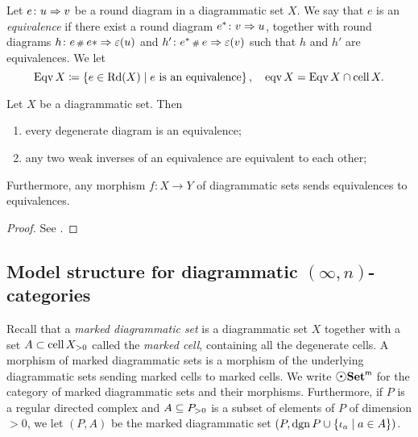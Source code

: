 \begin{dfn} [Equivalence] 
    Let \( e \colon u \celto v \) be a round diagram in a diagrammatic set \( X \).
    We say that \( e \) is an \emph{equivalence} if there exist a round diagram \( e^* \colon v \celto u \), together with round diagrams \( h \colon e \cp{} e* \celto \un(u) \) and \( h' \colon e^* \cp{} e \celto \un(v) \) such that \( h \) and \( h' \) are equivalences.
    We let
    \begin{equation*}
        \Eqv X \eqdef \set{e \in \Rd(X) \mid e \text{ is an equivalence}},\quad \eqv X = \Eqv X \cap \cell X.
    \end{equation*}
\end{dfn}

\begin{prop} \label{prop:main_equivalence}
    Let \( X \) be a diagrammatic set.
    Then
    \begin{enumerate}
        \item every degenerate diagram is an equivalence;
        \item any two weak inverses of an equivalence are equivalent to each other;
    \end{enumerate}
    Furthermore, any morphism \( f \colon X \to Y \) of diagrammatic sets sends equivalences to equivalences.
\end{prop}
\begin{proof}
    See \cite[Theorem 2.13, Corollary 2.29, Proposition 2.31]{chanavat2024equivalences}.
\end{proof}

\subsection{Model structure for diagrammatic \texorpdfstring{$(\infty, n)$}{(∞, n)}-categories}


Recall that a \emph{marked diagrammatic set} is a diagrammatic set \( X \) together with a set \( A \subset \gr{> 0}{\cell X} \) called the \emph{marked cell}, containing all the degenerate cells. 
A morphism of marked diagrammatic sets is a morphism of the underlying diagrammatic sets sending marked cells to marked cells.
We write \( \mdgmSet \) for the category of marked diagrammatic sets and their morphisms. 
Furthermore, if \( P \) is a regular directed complex and \( A \subseteq \gr{> 0}{P} \) is a subset of elements of \( P \) of dimension \( > 0 \), we let \( (P, A) \) be the marked diagrammatic set \( (P, \dgn P \cup \set{\mapel{a} \mid a \in A}) \).

